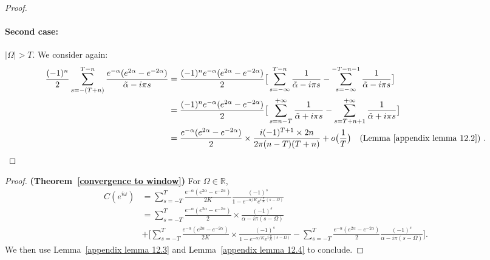 \begin{proof}
    \paragraph{Second case:} $\vert\Omega\vert > T$. We consider again: 
    \begin{align*}
         \frac{(-1)^n}{2}\sum_{s=-(T+n)}^{T-n}\frac{e^{-\alpha}(e^{2\alpha}-e^{-2\alpha})}{\tilde{\alpha} - i\pi s} 
        &=\frac{(-1)^ne^{-\alpha}(e^{2\alpha}-e^{-2\alpha})}{2}\big[\sum_{s=-\infty}^{T-n}\frac{1}{\tilde{\alpha} - i\pi s} - \sum_{s=-\infty}^{-T-n-1}\frac{1}{\tilde{\alpha} - i\pi s}\big]\\
        &=\frac{(-1)^ne^{-\alpha}(e^{2\alpha}-e^{-2\alpha})}{2}\big[\sum_{s=n-T}^{+\infty}\frac{1}{\tilde{\alpha}+i\pi s} - \sum_{s=T+n+1}^{+\infty}\frac{1}{\tilde{\alpha}+i\pi s}
        \big]\\
        &= \frac{e^{-\alpha}(e^{2\alpha}-e^{-2\alpha})}{2}\times \frac{i(-1)^{T+1}\times 2n}{2\pi(n-T)(T+n)} + o\big(\frac{1}{T}\big) \text{\quad (Lemma~\ref{appendix lemma 12.2}) }.
    \end{align*}
\end{proof} 

\begin{proof}\textbf{(Theorem~\ref{convergence to window})} \hspace*{.2cm}
For $\Omega\in\mathbb{R}$, 
\begin{align*}
    C(e^{i\omega}) &= \sum_{s=-T}^T\frac{e^{-\alpha}(e^{2\alpha}-e^{-2\alpha})}{2K}\frac{(-1)^s}{1-e^{-\alpha/K}e^{i\frac{\pi}{K}(s-\Omega)}}\\
    &= \sum_{s=-T}^T\frac{e^{-\alpha}(e^{2\alpha}-e^{-2\alpha})}{2}\times\frac{(-1)^s}{\alpha - i\pi(s-\Omega)}\\
    &+\big[\sum_{s=-T}^T\frac{e^{-\alpha}(e^{2\alpha}-e^{-2\alpha})}{2K}\times\frac{(-1)^s}{1-e^{-\alpha/K}e^{i\frac{\pi}{K}(s-\Omega)}} - \sum_{s=-T}^T\frac{e^{-\alpha}(e^{2\alpha}-e^{-2\alpha})}{2}\frac{(-1)^s}{\alpha - i\pi(s-\Omega)}
    \big].
\end{align*}
We then use Lemma~\ref{appendix lemma 12.3} and Lemma~\ref{appendix lemma 12.4} to conclude.
    
\end{proof}

    
